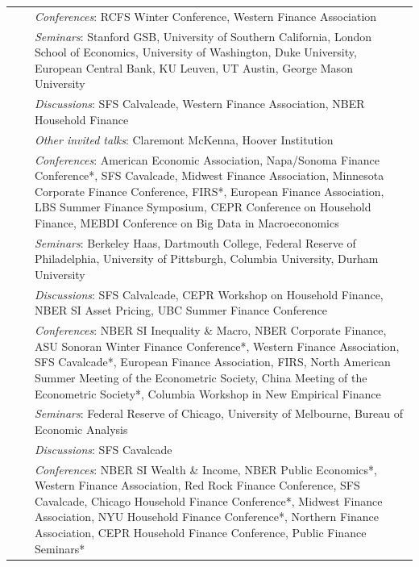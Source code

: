 \documentclass[6pt,letterpaper]{article}
\begin{document}
\begin{table}[H]
\begin{tabu} to \textwidth {l r X[l]}
	\rule{0pt}{3ex} & \color{white}{-00}\color{black}{2023}  & \textit{Conferences}: RCFS Winter Conference, Western Finance Association \\
	\rule{0pt}{4ex}&& \textit{Seminars}: Stanford GSB, University of Southern California, London School of Economics, University of Washington, Duke University, European Central Bank, KU Leuven, UT Austin, George Mason University \\
	\rule{0pt}{4ex} & & \textit{Discussions}:  SFS Calvalcade, Western Finance Association, NBER Household Finance   \\
	\rule{0pt}{4ex} & & \textit{Other invited talks}:  Claremont McKenna, Hoover Institution  \\
	\rule{0pt}{3ex} & \color{white}{-00}\color{black}{2022}  & \textit{Conferences}: American Economic Association, Napa/Sonoma Finance Conference*, SFS Cavalcade, Midwest Finance Association, Minnesota Corporate Finance Conference, FIRS*, European Finance Association, LBS Summer Finance Symposium, CEPR Conference on Household Finance, MEBDI Conference on Big Data in Macroeconomics \\
	\rule{0pt}{4ex}&& \textit{Seminars}: Berkeley Haas, Dartmouth College, Federal Reserve of Philadelphia, University of Pittsburgh, Columbia University, Durham University \\
	\rule{0pt}{4ex} & & \textit{Discussions}:  SFS Calvalcade, CEPR Workshop on Household Finance, NBER SI Asset Pricing, UBC Summer Finance Conference   \\
	\rule{0pt}{4ex} & \color{white}{-00}\color{black}{2021}  &  \textit{Conferences}: NBER SI Inequality \& Macro, NBER Corporate Finance, ASU Sonoran Winter
	Finance Conference*, Western Finance Association, SFS Cavalcade*, European Finance Association, FIRS, North American Summer Meeting of the Econometric Society, China Meeting of the Econometric Society*,  Columbia Workshop in New Empirical Finance \\
	\rule{0pt}{4ex}&& \textit{Seminars}: Federal Reserve of Chicago, University of Melbourne, Bureau of Economic Analysis \\
	\rule{0pt}{4ex} & & \textit{Discussions}:  SFS Cavalcade  \\
			\rule{0pt}{3ex} & \color{white}{-00}\color{black}{2020}  & \textit{Conferences}: NBER SI Wealth \& Income, NBER Public Economics*, Western Finance Association, Red Rock Finance Conference, SFS Cavalcade, Chicago Household Finance Conference*, Midwest Finance Association, NYU Household Finance Conference*, Northern Finance Association, CEPR Household Finance Conference, Public Finance Seminars* \\

\end{tabu}
\end{table}
\end{document}
